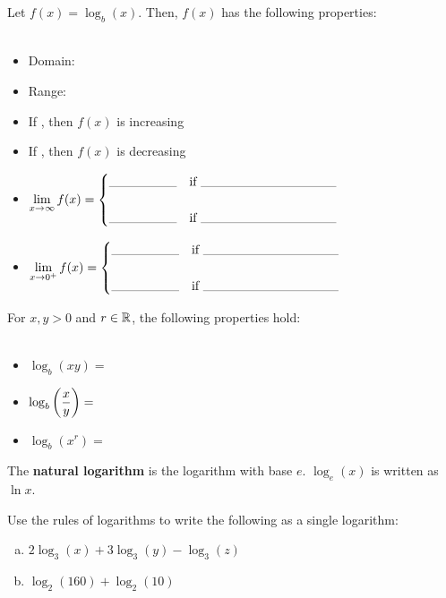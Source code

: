 \documentclass[notes]{subfiles}
\begin{document}
		\begin{rmk}
			Let \(f(x) = \log_b(x)\).  Then, \(f(x)\) has the following properties:\\ \\
			\begin{itemize}
				\setlength\itemsep{25pt}
				\item Domain:  
				\item Range: 
				\item If , then $f(x)$ is increasing
				\item If , then $f(x)$ is decreasing
				\item \(\ds\lim_{x\to \infty} f(x) = \begin{cases}\blank{.75}& \text{if } \blank{1.5}\\ & \\ \blank{.75}& \text{if } \blank{1.5} \end{cases}\)
				\item \(\ds\lim_{x\to 0^+} f(x) = \begin{cases}\blank{.75}& \text{if } \blank{1.5}\\ & \\ \blank{.75}& \text{if } \blank{1.5} \end{cases}\)
			\end{itemize}
		\end{rmk}
		
		\begin{rmk}
			For \(x,y>0\) and \(r\in \mathbb{R}\), the following properties hold:\\ \\
			\begin{itemize}
				\setlength\itemsep{15pt}
				\item \(\log_b(xy) = \)
				\item \(\log_b\left( \dfrac{x}{y}\right) = \)
				\item \(\log_b(x^r) = \)
			\end{itemize}
		\end{rmk}
			\newpage
			
		\begin{defn}
			The \textbf{natural logarithm} is the logarithm with base $e$.  $\log_e(x)$ is written as $\ln x$.
		\end{defn}
			
		\begin{ex}
			Use the rules of logarithms to write the following as a single logarithm:
			\begin{enumerate}[(a)]
				\item \(2\log_3(x) + 3\log_3(y) - \log_3(z)\)
					
				\item \(\log_2(160) + \log_2(10)\)
			\end{enumerate}
		\end{ex}
		
\end{document}
